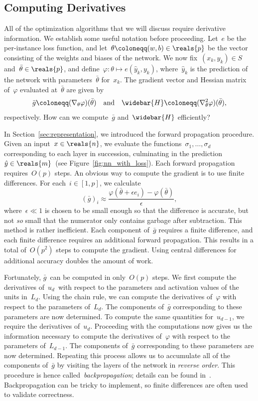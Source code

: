 \documentclass[11pt,a4paper]{article}
\numberwithin{equation}{section}
\begin{document}
\subsection{Computing Derivatives}
\label{sec:computing_derivatives}

All of the optimization algorithms that we will discuss require derivative
information. We establish some useful notation before proceeding. Let~$e$ be the
per-instance loss function, and let~$\theta \coloneqq (w, b) \in \reals{p}$ be
the vector consisting of the weights and biases of the network. We now
fix~$(x_k, y_k) \in S$ and~$\bar{\theta} \in \reals{p}$, and define~$\varphi :
\theta \mapsto e(\hat{y}_k, y_k)$, where~$\hat{y}_k$ is the prediction of the
network with parameters~$\bar{\theta}$ for~$x_k$. The gradient vector and
Hessian matrix of~$\varphi$ evaluated at~$\bar{\theta}$ are given by
\[
	\bar{g} \coloneqq (\nabla_\theta \varphi)(\bar{\theta})
	\quad\text{and}\quad
	\widebar{H} \coloneqq (\nabla^2_\theta \varphi)(\bar{\theta}),
\]
respectively. How can we compute~$\bar{g}$ and~$\widebar{H}$ efficiently?

In Section~\ref{sec:representation}, we introduced the forward propagation
procedure. Given an input~$x \in \reals{n}$, we evaluate the
functions~$\sigma_1, \ldots, \sigma_d$ corresponding to each layer in
succession, culminating in the prediction~$\hat{y} \in \reals{m}$~(see
Figure~\ref{fig:nn_with_loss}). Each forward propagation requires~$O(p)$ steps.
An obvious way to compute the gradient is to use finite differences. For each~$i
\in [1, p]$, we calculate
\[
	(\bar{g})_i \approx \frac{\varphi(\bar{\theta} + \epsilon e_i) -
		\varphi(\bar{\theta})}{\epsilon},
\]
where~$\epsilon \ll 1$ is chosen to be small enough so that the difference is
accurate, but not \emph{so} small that the numerator only contains garbage after
subtraction. This method is rather inefficient. Each component of~$\bar{g}$
requires a finite difference, and each finite difference requires an additional
forward propagation. This results in a total of~$O(p^2)$ steps to compute the
gradient. Using central differences for additional accuracy doubles the amount
of work.

Fortunately, $\bar{g}$~can be computed in only~$O(p)$ steps. We first compute
the derivatives of~$u_d$~with respect to the parameters and activation values of
the units in~$L_d$. Using the chain rule, we can compute the derivatives
of~$\varphi$ with respect to the parameters of~$L_d$. The components
of~$\bar{g}$ corresponding to these parameters are now determined. To compute
the same quantities for~$u_{d - 1}$, we require the derivatives of~$u_{d}$.
Proceeding with the computations now gives us the information necessary to
compute the derivatives of~$\varphi$ with respect to the parameters of~$L_{d -
1}$. The components of~$\bar{g}$ corresponding to these parameters are now
determined. Repeating this process allows us to accumulate all of the components
of~$\bar{g}$ by visiting the layers of the network in \emph{reverse order}.
This procedure is hence called~\emph{backpropagation}; details can be found
in~\citet{ml_bishop}. Backpropagation can be tricky to implement, so finite
differences are often used to validate correctness.
\end{document}

